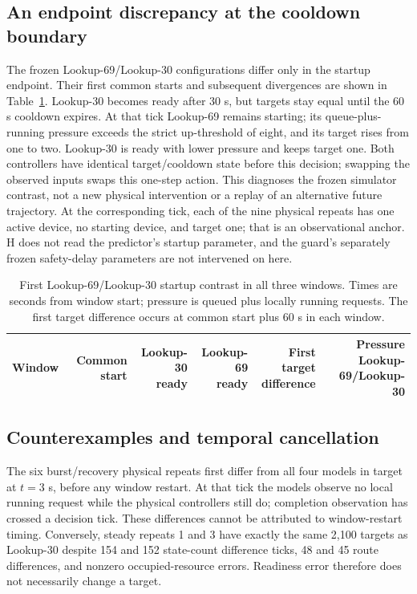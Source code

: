 \subsection{An endpoint discrepancy at the cooldown boundary}
The frozen Lookup-69/Lookup-30 configurations differ only in the startup endpoint.
Their first common starts and subsequent divergences are shown in
Table~\ref{tab:v5-endpoints}. Lookup-30 becomes ready after 30 s, but targets stay
equal until the 60 s cooldown expires. At that tick Lookup-69 remains starting;
its queue-plus-running pressure exceeds the strict up-threshold of eight,
and its target rises from one to two. Lookup-30 is ready with lower pressure and
keeps target one. Both controllers have identical target/cooldown state
before this decision; swapping the observed inputs swaps this one-step action.
This diagnoses the frozen simulator contrast, not a new physical intervention
or a replay of an alternative future trajectory. At the corresponding tick,
each of the nine physical repeats has one active device, no starting device,
and target one; that is an observational anchor.
H does not read the predictor's startup parameter, and the guard's separately
frozen safety-delay parameters are not intervened on here.

\begin{table}[t]
\centering
\small
\caption{First Lookup-69/Lookup-30 startup contrast in all three windows. Times are seconds
from window start; pressure is queued plus locally running requests. The first
target difference occurs at common start plus 60 s in each window.}
\label{tab:v5-endpoints}
\par\vspace{4pt}
\begin{tabular*}{0.92\linewidth}{@{\extracolsep{\fill}}lrrrrr@{}}
\toprule
Window & Common start & \shortstack{Lookup-30\\ready} & \shortstack{Lookup-69\\ready} & \shortstack{First target\\difference} & \shortstack{Pressure\\Lookup-69/Lookup-30}\\
\midrule

\end{tabular*}
\end{table}

\subsection{Counterexamples and temporal cancellation}
The six burst/recovery physical repeats first differ from all four models
in target at $t=3$ s, before any window restart. At that tick the models
observe no local running request while the physical controllers still do;
completion observation has crossed a decision tick. These differences cannot
be attributed to window-restart timing. Conversely, steady repeats 1 and 3 have exactly
the same 2,100 targets as Lookup-30 despite 154 and 152 state-count difference
ticks, 48 and 45 route differences, and nonzero occupied-resource errors.
Readiness error therefore does not necessarily change a target.

